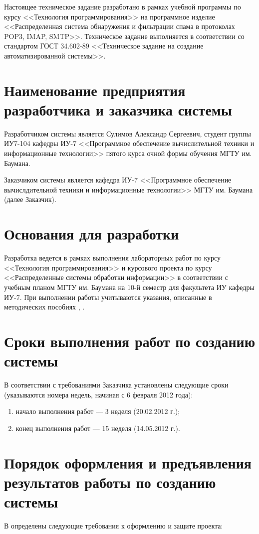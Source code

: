 \Introduction
Настоящее техническое задание разработано в рамках учебной программы по курсу <<Технология программирования>> на программное изделие <<Распределенная система обнаружения и фильтрации спама в протоколах POP3, IMAP, SMTP>>. Техническое задание выполняется в соответствии со стандартом ГОСТ 34.602-89 <<Техническое задание на создание автоматизированной системы>>.

\section{Наименование предприятия разработчика и заказчика системы}
Разработчиком системы является Сулимов Александр Сергеевич, студент группы ИУ7-104 кафедры ИУ-7 <<Программное обеспечение вычислительной техники и информационные технологии>> пятого курса очной формы обучения МГТУ им. Баумана.

Заказчиком системы является кафедра ИУ-7 <<Программное обеспечение вычислдительной техники и информационные технологии>> МГТУ им. Баумана (далее Заказчик).

\section{Основания для разработки}
Разработка ведется в рамках выполнения лабораторных работ по курсу <<Технология программирования>> и курсового проекта по курсу <<Распределенные системы обработки информации>> в соответствии с учебным планом МГТУ им. Баумана на 10-й семестр для факультета ИУ кафедры ИУ-7. При выполнении работы учитываются указания, описанные в методических пособиях \cite{metodRomanova}, \cite{metodKKrishenko}.

\section{Сроки выполнения работ по созданию системы}
В соответствии с требованиями Заказчика установлены следующие сроки (указываются номера недель, начиная с 6 февраля 2012 года):

\begin{enumerate}
	\item начало выполнения работ --- 3 неделя (20.02.2012 г.);
	\item конец выполнения работ --- 15 неделя (14.05.2012 г.).
\end{enumerate}

\section{Порядок оформления и предъявления результатов работы по созданию системы}
В \cite{metodKKrishenko} определены следующие требования к оформлению и защите проекта:

